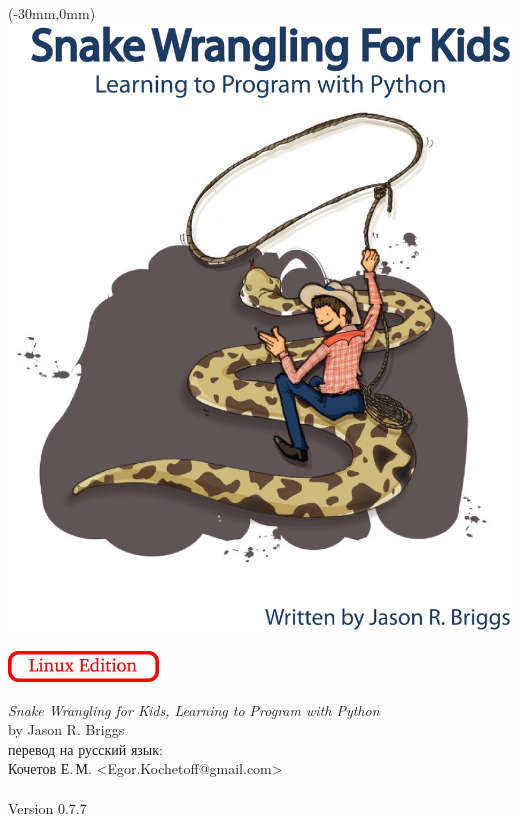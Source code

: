 \pagestyle{empty}
\frontmatter
\begin{titlepage}
\begin{textblock*}{210mm}(-30mm,0mm)
   \includegraphics[width=0.9\paperwidth]{../en/cover.eps}
\end{textblock*}
\begin{flushright}
\vspace{30mm}
\includegraphics[width=40mm]{../en/linux-edition.eps} 
\end{flushright}
\end{titlepage}
\noindent
\textsf{\emph{Snake Wrangling for Kids, Learning to Program with Python}}\\
by Jason R. Briggs\\
перевод на русский язык:\\
Кочетов Е.\,М. <Egor.Kochetoff@gmail.com>\\
\\
Version 0.7.7
\\\\
